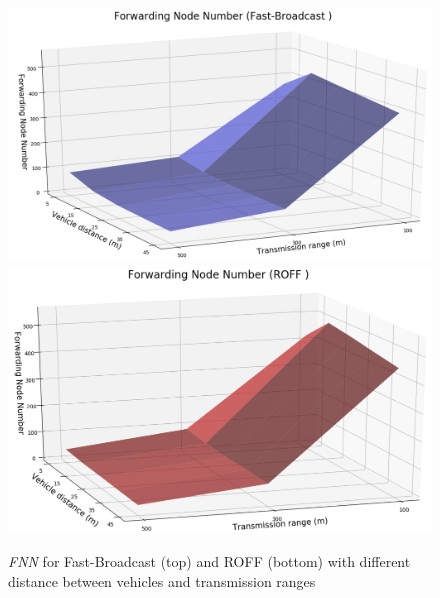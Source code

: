 		\begin{figure}[H]
			\centering
			\includegraphics[width=1.0\textwidth]{immagini/density/fb/fnn-1}
			\includegraphics[width=1.0\textwidth]{immagini/density/roff/fnn-1}
			\caption{\textit{FNN} for Fast-Broadcast (top) and ROFF (bottom) with different distance between vehicles and transmission ranges}
			\label{fig:density-fnn-1}
		\end{figure}
	

